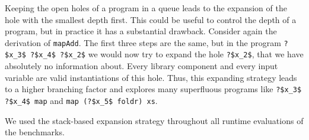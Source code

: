 Keeping the open holes of a program in a queue leads to the expansion of the hole with the smallest depth first. This could be useful to control the depth of a program, but in practice it has a substantial drawback. Consider again the derivation of \lstinline?mapAdd?. The first three steps are the same, but in the program \lstinline!?$x_3$ ?$x_4$ ?$x_2$! we would now try to expand the hole \lstinline!?$x_2$!, that we have absolutely no information about. Every library component and every input variable are valid instantiations of this hole. Thus, this expanding strategy leads to a higher branching factor and explores many superfluous programs like \lstinline!?$x_3$ ?$x_4$ map! and \lstinline!map (?$x_5$ foldr) xs!.

We used the stack-based expansion strategy throughout all runtime evaluations of the benchmarks.


